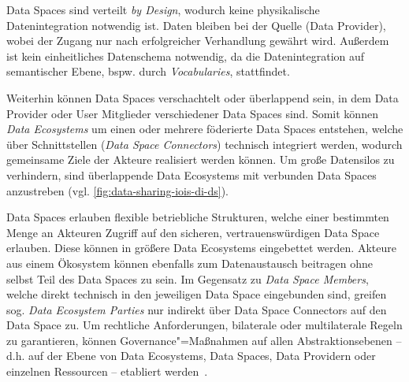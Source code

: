 Data Spaces sind verteilt \emph{by Design}, wodurch keine physikalische Datenintegration notwendig ist.
Daten bleiben bei der Quelle (Data Provider), wobei der Zugang nur nach erfolgreicher Verhandlung gewährt wird.
Außerdem ist kein einheitliches Datenschema notwendig, da die Datenintegration auf semantischer Ebene, bspw. durch \emph{Vocabularies}, stattfindet.

Weiterhin können Data Spaces verschachtelt oder überlappend sein, in dem Data Provider oder User Mitglieder verschiedener Data Spaces sind.
Somit können \emph{Data Ecosystems} um einen oder mehrere föderierte Data Spaces entstehen, welche über Schnittstellen (\emph{Data Space Connectors}) technisch integriert werden, wodurch gemeinsame Ziele der Akteure realisiert werden können.
Um große Datensilos zu verhindern, sind überlappende Data Ecosystems mit verbunden Data Spaces anzustreben (vgl. \autoref{fig:data-sharing-iois-di-ds}).

Data Spaces erlauben flexible betriebliche Strukturen, welche einer bestimmten Menge an Akteuren Zugriff auf den sicheren, vertrauenswürdigen Data Space erlauben.
Diese können in größere Data Ecosystems eingebettet werden.
Akteure aus einem Ökosystem können ebenfalls zum Datenaustausch beitragen ohne selbst Teil des Data Spaces zu sein.
Im Gegensatz zu \emph{Data Space Members}, welche direkt technisch in den jeweiligen Data Space eingebunden sind, greifen sog. \emph{Data Ecosystem Parties} nur indirekt über Data Space Connectors auf den Data Space zu.
Um rechtliche Anforderungen, bilaterale oder multilaterale Regeln zu garantieren, können Governance"=Maßnahmen auf allen Abstraktionsebenen -- d.h. auf der Ebene von Data Ecosystems, Data Spaces, Data Providern oder einzelnen Ressourcen -- etabliert werden~\cite{mollerIndustrialDataEcosystems2024}.
